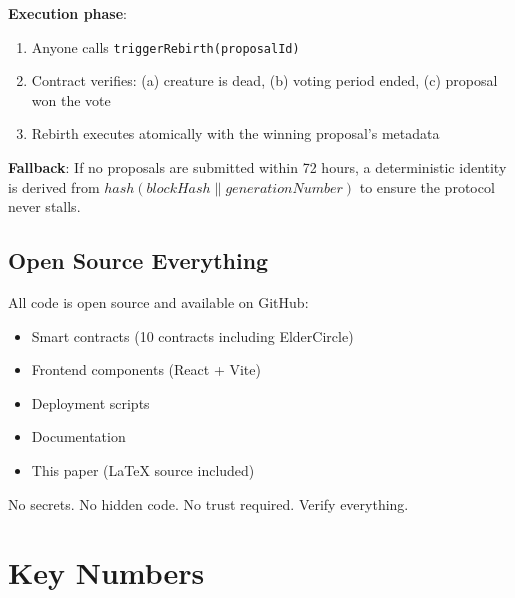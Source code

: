 \documentclass[11pt,a4paper]{article}
\begin{document}
\textbf{Execution phase}:
\begin{enumerate}
    \item Anyone calls \texttt{triggerRebirth(proposalId)}
    \item Contract verifies: (a) creature is dead, (b) voting period ended, (c) proposal won the vote
    \item Rebirth executes atomically with the winning proposal's metadata
\end{enumerate}

\textbf{Fallback}: If no proposals are submitted within 72 hours, a deterministic identity is derived from $hash(blockHash \| generationNumber)$ to ensure the protocol never stalls.

\subsection{Open Source Everything}

All code is open source and available on GitHub:

\begin{itemize}
    \item Smart contracts (10 contracts including ElderCircle)
    \item Frontend components (React + Vite)
    \item Deployment scripts
    \item Documentation
    \item This paper (LaTeX source included)
\end{itemize}

No secrets. No hidden code. No trust required. Verify everything.

\section{Key Numbers}
\end{document}
